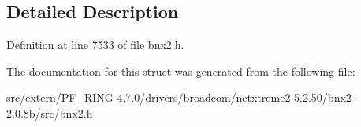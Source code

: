 \subsection{Detailed Description}


Definition at line 7533 of file bnx2.h.



The documentation for this struct was generated from the following file:\begin{DoxyCompactItemize}
\item 
src/extern/PF\_\-RING-\/4.7.0/drivers/broadcom/netxtreme2-\/5.2.50/bnx2-\/2.0.8b/src/bnx2.h\end{DoxyCompactItemize}
